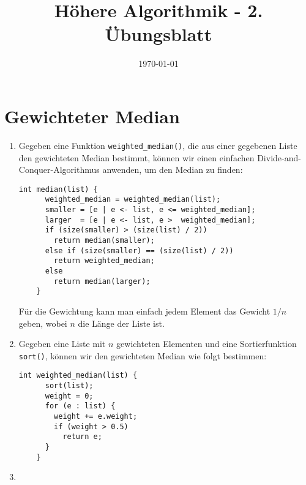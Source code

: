 \documentclass[a4paper,10pt]{scrartcl}
\title{H\"ohere Algorithmik - 2. \"Ubungsblatt}
\author{\Authors}
\date{\today}
\begin{document}
\maketitle

\section{Gewichteter Median}
\begin{enumerate}
\item	Gegeben eine Funktion \texttt{weighted\_median()}, die
	aus einer gegebenen Liste den gewichteten Median bestimmt,
	können wir einen einfachen Divide-and-Conquer-Algorithmus
	anwenden, um den Median zu finden:

	\begin{lstlisting}[numbers=none]
	int median(list) {
	  weighted_median = weighted_median(list);
	  smaller = [e | e <- list, e <= weighted_median];
	  larger  = [e | e <- list, e >  weighted_median];
	  if (size(smaller) > (size(list) / 2))
	    return median(smaller);
	  else if (size(smaller) == (size(list) / 2))
	    return weighted_median;
	  else
	    return median(larger);
	}
	\end{lstlisting}

	Für die Gewichtung kann man einfach jedem Element das Gewicht
	$1/n$ geben, wobei $n$ die Länge der Liste ist.

\item	Gegeben eine Liste mit $n$ gewichteten Elementen und eine
	Sortierfunktion \texttt{sort()}, können wir den gewichteten
	Median wie folgt bestimmen:

	\begin{lstlisting}[numbers=none]
	int weighted_median(list) {
	  sort(list);
	  weight = 0;
	  for (e : list) {
	    weight += e.weight;
	    if (weight > 0.5)
	      return e;
	  }
	}
	\end{lstlisting}

\item

\end{enumerate}
\end{document}
